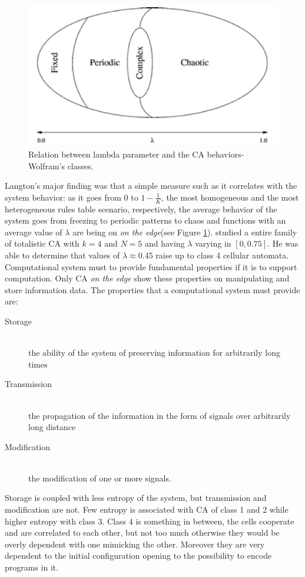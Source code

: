 \begin{figure}
\centering
\caption{Relation between lambda parameter and the CA
behaviors-Wolfram's classes.}\label{lambdaWolframClass}
\includegraphics[scale=0.4]{./images/CA_FDM/edgeofchaos}
\end{figure}
Langton's major finding was that a simple measure such as it correlates with the
system behavior: as it goes from $0$ to $ 1-\frac{1}{K}$, the most
homogeneous and the most heterogeneous rules table scenario, respectively, the average
behavior of the system goes from freezing to periodic patterns to chaos and functions with an average value of $\lambda$ are being on \emph{on the edge}\cite{Langton1990}(see Figure \ref{lambdaWolframClass}).
\citeauthor{Langton1990} studied a entire family of totalistic CA with $k=4
$ and $N=5$ and having $\lambda$ varying in $[0,0.75]$. He was able to determine that values
of $\lambda\approx0.45$ raise up to class 4 cellular automata.
Computational system must to provide fundamental properties if it is
to support computation. Only CA \emph{on the edge} show these properties on
manipulating and store information data.
The properties that a computational system must provide are:
\begin{description}
  \item[Storage] \hfill \\
   the ability of the system of preserving information for
arbitrarily long times
  \item[Transmission] \hfill \\
  the propagation of the information in the
form of signals over arbitrarily long distance
  \item[Modification] \hfill \\
	the modification of one or more signals.
\end{description}
Storage is coupled with less entropy of the system, but transmission and
modification are not. Few entropy is associated with CA of class 1 and 2 while
higher entropy with class 3. Class 4 is something in between, the cells cooperate
and are correlated to each other, but not too much otherwise they would be overly
dependent with one mimicking the other. Moreover they are very dependent to the initial
configuration opening to the possibility to encode programs in it.

